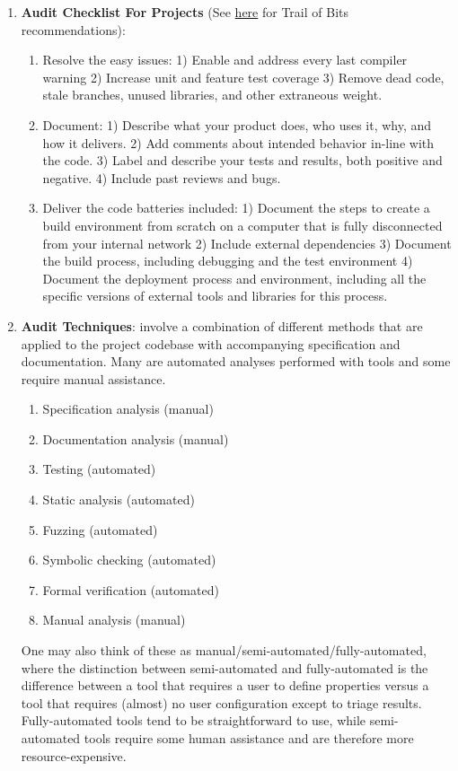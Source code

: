 \begin{enumerate}
\item\textbf{Audit Checklist For Projects} (See \href{https://blog.trailofbits.com/2018/04/06/how-to-prepare-for-a-security-audit/}{here} for Trail of Bits recommendations):
	\begin{enumerate}
	\item Resolve the easy issues: 1) Enable and address every last compiler warning 2) Increase unit and feature test coverage 3) Remove dead code, stale branches, unused libraries, and other extraneous weight.
	\item Document: 1) Describe what your product does, who uses it, why, and how it delivers. 2) Add comments about intended behavior in-line with the code. 3) Label and describe your tests and results, both positive and negative. 4) Include past reviews and bugs.
	\item Deliver the code batteries included: 1) Document the steps to create a build environment from scratch on a computer that is fully disconnected from your internal network 2) Include external dependencies 3) Document the build process, including debugging and the test environment 4) Document the deployment process and environment, including all the specific versions of external tools and libraries for this process.
	\end{enumerate}

\item\textbf{Audit Techniques}: involve a combination of different methods that are applied to the project codebase with accompanying specification and documentation. Many are automated analyses performed with tools and some require manual assistance.
	\begin{enumerate}
	\item Specification analysis (manual)
	\item Documentation analysis (manual)
	\item Testing (automated)
	\item Static analysis (automated)
	\item Fuzzing (automated)
	\item Symbolic checking (automated)
	\item Formal verification (automated)
	\item Manual analysis (manual)
	\end{enumerate}
One may also think of these as manual/semi-automated/fully-automated, where the distinction between semi-automated and fully-automated is the difference between a tool that requires a user to define properties versus a tool that requires (almost) no user configuration except to triage results. Fully-automated tools tend to be straightforward to use, while semi-automated tools require some human assistance and are therefore more resource-expensive.


\end{enumerate}
